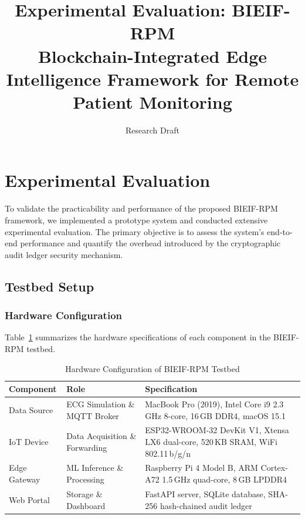 \documentclass[10pt,twocolumn]{article}
\title{\textbf{Experimental Evaluation: BIEIF-RPM}\\[0.5em]
\large Blockchain-Integrated Edge Intelligence Framework for Remote Patient Monitoring}
\author{Research Draft}
\date{}
\begin{document}
\maketitle

\section{Experimental Evaluation}
\label{sec:experiments}

To validate the practicability and performance of the proposed BIEIF-RPM framework, we implemented a prototype system and conducted extensive experimental evaluation. The primary objective is to assess the system's end-to-end performance and quantify the overhead introduced by the cryptographic audit ledger security mechanism.

\subsection{Testbed Setup}
\label{subsec:testbed}

\subsubsection{Hardware Configuration}

Table~\ref{tab:hardware} summarizes the hardware specifications of each component in the BIEIF-RPM testbed.

\begin{table}[htbp]
\centering
\caption{Hardware Configuration of BIEIF-RPM Testbed}
\label{tab:hardware}
\footnotesize
\begin{tabular}{@{}p{1.5cm}p{1.8cm}p{4cm}@{}}
\toprule
\textbf{Component} & \textbf{Role} & \textbf{Specification} \\
\midrule
Data Source & ECG Simulation \& MQTT Broker & MacBook Pro (2019), Intel Core i9 2.3\,GHz 8-core, 16\,GB DDR4, macOS 15.1 \\
\addlinespace
IoT Device & Data Acquisition \& Forwarding & ESP32-WROOM-32 DevKit V1, Xtensa LX6 dual-core, 520\,KB SRAM, WiFi 802.11\,b/g/n \\
\addlinespace
Edge Gateway & ML Inference \& Processing & Raspberry Pi 4 Model B, ARM Cortex-A72 1.5\,GHz quad-core, 8\,GB LPDDR4 \\
\addlinespace
Web Portal & Storage \& Dashboard & FastAPI server, SQLite database, SHA-256 hash-chained audit ledger \\
\bottomrule
\end{tabular}
\end{table}
\end{document}
